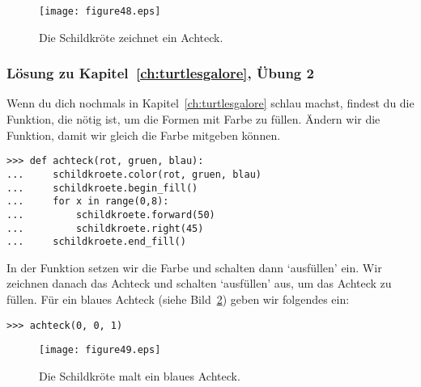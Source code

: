 \begin{figure}
\begin{center}
\texttt{[image: figure48.eps]}
\end{center}
\caption{Die Schildkröte zeichnet ein Achteck.}\label{fig48}
\end{figure}

\noindent
\subsubsection{Lösung zu Kapitel~\ref{ch:turtlesgalore}, Übung 2}
Wenn du dich nochmals in Kapitel~\ref{ch:turtlesgalore} schlau machst, findest du die Funktion, die nötig ist, um die Formen mit Farbe zu füllen. Ändern wir die  Funktion, damit wir gleich die Farbe mitgeben können.

\begin{Verbatim}[frame=single]
>>> def achteck(rot, gruen, blau):
...     schildkroete.color(rot, gruen, blau)
...     schildkroete.begin_fill()
...     for x in range(0,8):
...         schildkroete.forward(50)
...         schildkroete.right(45)
...     schildkroete.end_fill()
\end{Verbatim}

In der Funktion setzen wir die Farbe und schalten dann `ausfüllen' ein. Wir zeichnen danach das Achteck und schalten `ausfüllen' aus, um das Achteck zu füllen. Für ein blaues Achteck (siehe Bild~\ref{fig49}) geben wir folgendes ein:

\begin{Verbatim}[frame=single]
>>> achteck(0, 0, 1)
\end{Verbatim}

\begin{figure}
\begin{center}
\texttt{[image: figure49.eps]}
\end{center}
\caption{Die Schildkröte malt ein blaues Achteck.}\label{fig49}
\end{figure}
\newpage
